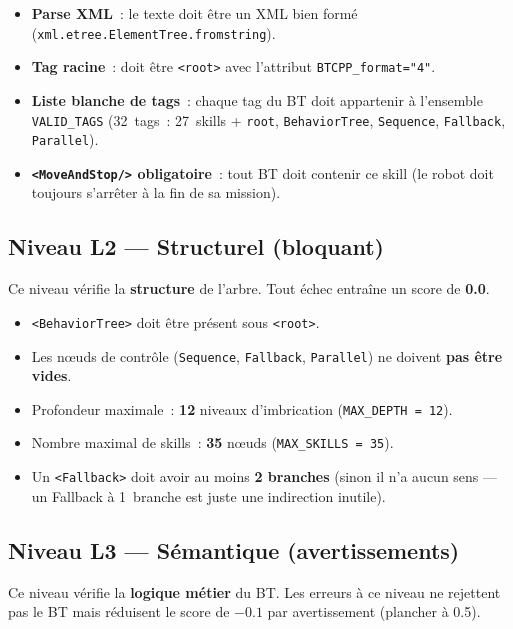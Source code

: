 \documentclass[a4paper,11pt]{article}
\newcommand{\skill}[1]{\texttt{<#1/>}}
\begin{document}
\begin{itemize}
    \item \textbf{Parse XML}~: le texte doit être un XML bien formé
    (\texttt{xml.etree.ElementTree.fromstring}).
    \item \textbf{Tag racine}~: doit être \texttt{<root>} avec l'attribut
    \texttt{BTCPP\_format="4"}.
    \item \textbf{Liste blanche de tags}~: chaque tag du BT doit appartenir
    à l'ensemble \texttt{VALID\_TAGS} (32~tags~: 27~skills +
    \texttt{root}, \texttt{BehaviorTree}, \texttt{Sequence},
    \texttt{Fallback}, \texttt{Parallel}).
    \item \textbf{\skill{MoveAndStop} obligatoire}~: tout BT doit contenir
    ce skill (le robot doit toujours s'arrêter à la fin de sa mission).
\end{itemize}

\subsection{Niveau L2 --- Structurel (bloquant)}

Ce niveau vérifie la \textbf{structure} de l'arbre. Tout échec entraîne
un score de \textbf{0.0}.

\begin{itemize}
    \item \texttt{<BehaviorTree>} doit être présent sous \texttt{<root>}.
    \item Les nœuds de contrôle (\texttt{Sequence}, \texttt{Fallback},
    \texttt{Parallel}) ne doivent \textbf{pas être vides}.
    \item Profondeur maximale~: \textbf{12} niveaux d'imbrication
    (\texttt{MAX\_DEPTH = 12}).
    \item Nombre maximal de skills~: \textbf{35} nœuds
    (\texttt{MAX\_SKILLS = 35}).
    \item Un \texttt{<Fallback>} doit avoir au moins \textbf{2 branches}
    (sinon il n'a aucun sens --- un Fallback à 1~branche est juste une
    indirection inutile).
\end{itemize}

\subsection{Niveau L3 --- Sémantique (avertissements)}

Ce niveau vérifie la \textbf{logique métier} du BT. Les erreurs à ce
niveau ne rejettent pas le BT mais réduisent le score de $-0.1$ par
avertissement (plancher à 0.5).
\end{document}
